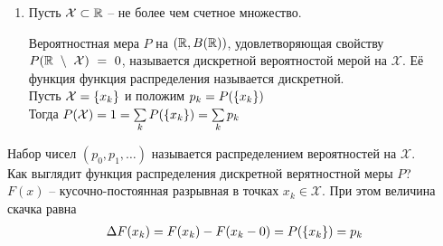 \begin{enumerate}[label=\protect\circled{\arabic*},series=distributions]
	\item 

		Пусть $\mathcal{X} \subset \mathbb{R}$ -- не более чем счетное множество.
		\begin{definition}
			Вероятностная мера $P$ на $(\mathbb{R}, B(\mathbb{R}))$, 
			удовлетворяющая свойству $P(\mathbb{R}~\setminus~\mathcal{X})~=~0$, 
			называется дискретной вероятностой мерой на $\mathcal{X}$. 
			Её функция функция распределения называется дискретной.\\
			Пусть $\mathcal{X} = \left\{ x_k \right\}$ и положим $p_k = P(\left\{ x_k \right\})$\\
			Тогда $P(\mathcal{X}) = 1 = \sum\limits_{k} P(\left\{ x_k \right\}) = \sum\limits_k p_k$
		\end{definition}
\end{enumerate}

\begin{definition}
	Набор чисел $(p_0, p_1, \ldots)$ называется распределением вероятностей на $\mathcal{X}$.\\
	
	Как выглядит функция распределения дискретной верятностной меры $P$?\\
	$F(x)$ -- кусочно-постоянная разрывная в точках $x_k \in \mathcal{X}$. 
	При этом величина скачка равна
	\begin{align*}
		\Delta F(x_k) = F(x_k) - F(x_k - 0) = P(\left\{ x_k \right\}) = p_k
	\end{align*}
\end{definition}


